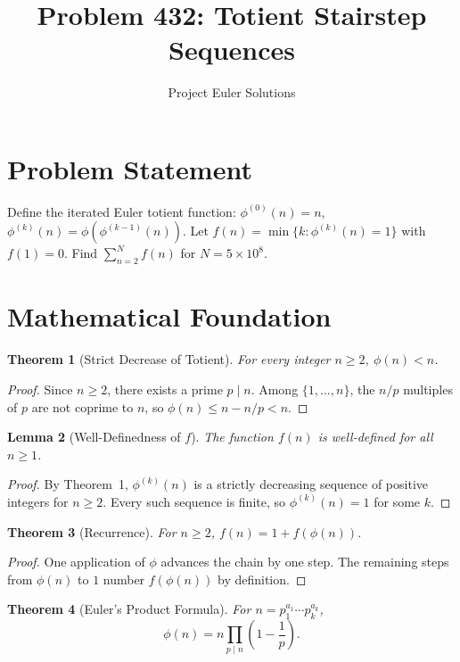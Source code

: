 \documentclass[11pt]{article}
\title{Problem 432: Totient Stairstep Sequences}
\author{Project Euler Solutions}
\date{}
\newtheorem{theorem}{Theorem}
\newtheorem{lemma}[theorem]{Lemma}
\begin{document}
\maketitle

\section{Problem Statement}
Define the iterated Euler totient function: $\phi^{(0)}(n) = n$, $\phi^{(k)}(n) = \phi(\phi^{(k-1)}(n))$. Let $f(n) = \min\{k : \phi^{(k)}(n) = 1\}$ with $f(1) = 0$. Find $\sum_{n=2}^{N} f(n)$ for $N = 5 \times 10^8$.

\section{Mathematical Foundation}

\begin{theorem}[Strict Decrease of Totient]
For every integer $n \geq 2$, $\phi(n) < n$.
\end{theorem}

\begin{proof}
Since $n \geq 2$, there exists a prime $p \mid n$. Among $\{1, \ldots, n\}$, the $n/p$ multiples of $p$ are not coprime to $n$, so $\phi(n) \leq n - n/p < n$.
\end{proof}

\begin{lemma}[Well-Definedness of $f$]
The function $f(n)$ is well-defined for all $n \geq 1$.
\end{lemma}

\begin{proof}
By Theorem~1, $\phi^{(k)}(n)$ is a strictly decreasing sequence of positive integers for $n \geq 2$. Every such sequence is finite, so $\phi^{(k)}(n) = 1$ for some $k$.
\end{proof}

\begin{theorem}[Recurrence]
For $n \geq 2$, $f(n) = 1 + f(\phi(n))$.
\end{theorem}

\begin{proof}
One application of $\phi$ advances the chain by one step. The remaining steps from $\phi(n)$ to $1$ number $f(\phi(n))$ by definition.
\end{proof}

\begin{theorem}[Euler's Product Formula]
For $n = p_1^{a_1} \cdots p_k^{a_k}$,
\[
\phi(n) = n \prod_{p \mid n} \left(1 - \frac{1}{p}\right).
\]
\end{theorem}
\end{document}
